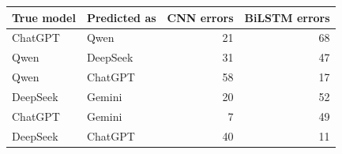 \begin{tabular}{llrr}
\toprule
True model & Predicted as & CNN errors & BiLSTM errors \\
\midrule
ChatGPT & Qwen & 21 & 68 \\
Qwen & DeepSeek & 31 & 47 \\
Qwen & ChatGPT & 58 & 17 \\
DeepSeek & Gemini & 20 & 52 \\
ChatGPT & Gemini & 7 & 49 \\
DeepSeek & ChatGPT & 40 & 11 \\
\bottomrule
\end{tabular}
